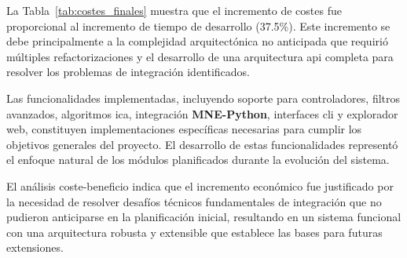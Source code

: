 \begin{table}[htbp!]
  \centering
  \caption{Evolución de costes del proyecto: planificado vs. real}
  \label{tab:costes_finales}
\end{table}

La Tabla~\ref{tab:costes_finales} muestra que el incremento de costes fue proporcional al incremento de tiempo de desarrollo (37.5\%). Este incremento se debe principalmente a la complejidad arquitectónica no anticipada que requirió múltiples refactorizaciones y el desarrollo de una arquitectura \acrshort{api} completa para resolver los problemas de integración identificados.

Las funcionalidades implementadas, incluyendo soporte para controladores, filtros avanzados, algoritmos \acrshort{ica}, integración \textbf{MNE-Python}, interfaces \acrshort{cli} y explorador web, constituyen implementaciones específicas necesarias para cumplir los objetivos generales del proyecto. El desarrollo de estas funcionalidades representó el enfoque natural de los módulos planificados durante la evolución del sistema.

El análisis coste-beneficio indica que el incremento económico fue justificado por la necesidad de resolver desafíos técnicos fundamentales de integración que no pudieron anticiparse en la planificación inicial, resultando en un sistema funcional con una arquitectura robusta y extensible que establece las bases para futuras extensiones.